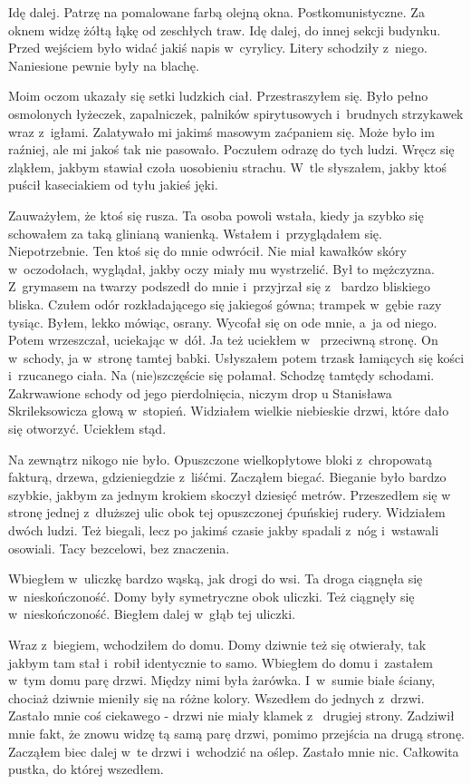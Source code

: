 Idę dalej. Patrzę na pomalowane farbą olejną okna. Postkomunistyczne. Za oknem widzę żółtą łąkę od zeschłych traw. 
Idę dalej, do innej sekcji budynku. Przed wejściem było widać jakiś napis w~cyrylicy. Litery schodziły z~niego. 
Naniesione pewnie były na blachę.

Moim oczom ukazały się setki ludzkich ciał. Przestraszyłem się. Było pełno osmolonych łyżeczek, zapalniczek, palników 
spirytusowych i~brudnych strzykawek wraz z~igłami. Zalatywało mi jakimś masowym zaćpaniem się. Może było im raźniej, 
ale mi jakoś tak nie pasowało. Poczułem odrazę do tych ludzi. Wręcz się zląkłem, jakbym stawiał czoła uosobieniu 
strachu. W~tle słyszałem, jakby ktoś puścił kaseciakiem od tyłu jakieś jęki.

Zauważyłem, że ktoś się rusza. Ta osoba powoli wstała, kiedy ja szybko się schowałem za taką glinianą wanienką. 
Wstałem i~przyglądałem się. Niepotrzebnie. Ten ktoś się do mnie odwrócił. Nie miał kawałków skóry w~oczodołach, 
wyglądał, jakby oczy miały mu wystrzelić. Był to mężczyzna. Z~grymasem na twarzy podszedł do mnie i~przyjrzał się z~
bardzo bliskiego bliska. Czułem odór rozkładającego się jakiegoś gówna; trampek w~gębie razy tysiąc. Byłem, lekko 
mówiąc, osrany. Wycofał się on ode mnie, a~ja od niego. Potem wrzeszczał, uciekając w~dół. Ja też uciekłem w~
przeciwną stronę. On w~schody, ja w~stronę tamtej babki. Usłyszałem potem trzask łamiących się kości i~rzucanego 
ciała. Na (nie)szczęście się połamał. Schodzę tamtędy schodami. Zakrwawione schody od jego pierdolnięcia, niczym drop 
u Stanisława Skrileksowicza głową w~stopień. Widziałem wielkie niebieskie drzwi, które dało się otworzyć. Uciekłem 
stąd.

\paraSep

Na zewnątrz nikogo nie było. Opuszczone wielkopłytowe bloki z~chropowatą fakturą, drzewa, gdzieniegdzie z~liśćmi. 
Zacząłem biegać. Bieganie było bardzo szybkie, jakbym za jednym krokiem skoczył dziesięć metrów. Przeszedłem się w~
stronę jednej z~dłuższej ulic obok tej opuszczonej ćpuńskiej rudery. Widziałem dwóch ludzi. Też biegali, lecz po 
jakimś czasie jakby spadali z~nóg i~wstawali osowiali. Tacy bezcelowi, bez znaczenia.

Wbiegłem w~uliczkę bardzo wąską, jak drogi do wsi. Ta droga ciągnęła się w~nieskończoność. Domy były symetryczne obok 
uliczki. Też ciągnęły się w~nieskończoność. Biegłem dalej w~głąb tej uliczki.

\paraSep

Wraz z~biegiem, wchodziłem do domu. Domy dziwnie też się otwierały, tak jakbym tam stał i~robił identycznie to samo. 
Wbiegłem do domu i~zastałem w~tym domu parę drzwi. Między nimi była żarówka. I~w~sumie białe ściany, chociaż dziwnie 
mieniły się na różne kolory. Wszedłem do jednych z~drzwi. Zastało mnie coś ciekawego - drzwi nie miały klamek z~
drugiej strony. Zadziwił mnie fakt, że znowu widzę tą samą parę drzwi, pomimo przejścia na drugą stronę. Zacząłem 
biec dalej w~te drzwi i~wchodzić na oślep. Zastało mnie nic. Całkowita pustka, do której wszedłem.

